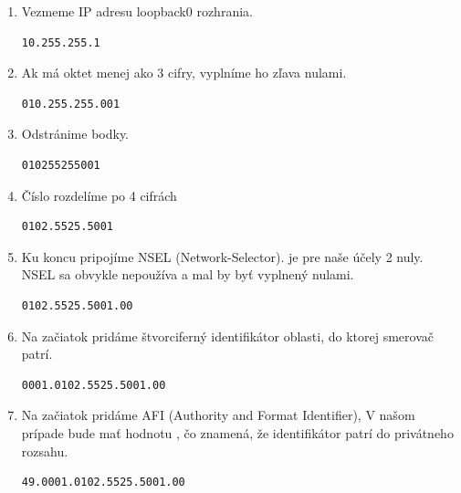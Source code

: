 \documentclass[12pt,twoside,a4paper]{report}
\begin{document}
\begin{enumerate}
\item Vezmeme IP adresu loopback0 rozhrania.
\noindent
{\selectfont
\begin{small}
\begin{verbatim}
10.255.255.1
\end{verbatim}
\end{small}
}


\item Ak má oktet menej ako 3 cifry, vyplníme ho zľava nulami.
\noindent
{\selectfont
\begin{small}
\begin{verbatim}
010.255.255.001
\end{verbatim}
\end{small}
}

\item Odstránime bodky.
\noindent
{\selectfont
\begin{small}
\begin{verbatim}
010255255001
\end{verbatim}
\end{small}
}

\item Číslo rozdelíme po 4 cifrách
\noindent
{\selectfont
\begin{small}
\begin{verbatim}
0102.5525.5001
\end{verbatim}
\end{small}
}

\item Ku koncu pripojíme NSEL (Network-Selector).  je pre naše účely 2 nuly. NSEL sa obvykle nepoužíva a mal by byť vyplnený nulami.
\noindent
{\selectfont
\begin{small}
\begin{verbatim}
0102.5525.5001.00
\end{verbatim}
\end{small}
}

\item Na začiatok pridáme štvorciferný identifikátor oblasti, do ktorej smerovač patrí.
\noindent
{\selectfont
\begin{small}
\begin{verbatim}
0001.0102.5525.5001.00
\end{verbatim}
\end{small}
}


\item Na začiatok pridáme AFI (Authority and Format Identifier), V našom prípade bude mať hodnotu , čo znamená, že identifikátor patrí do privátneho rozsahu.
\noindent
{\selectfont
\begin{small}
\begin{verbatim}
49.0001.0102.5525.5001.00
\end{verbatim}
\end{small}
}
\end{enumerate}
\end{document}
